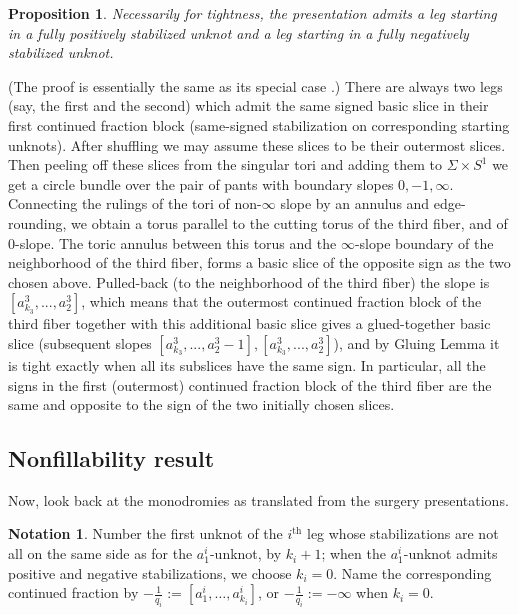 \documentclass{amsart}
\newtheorem{prop}[thm]{Proposition}
\theoremstyle{definition}
\newtheorem{notation}[thm]{Notation}
\begin{document}
\begin{prop}\label{prop:opposite}
Necessarily for tightness, the presentation admits a leg starting in a fully positively stabilized unknot and a leg starting in a fully negatively stabilized unknot.
\end{prop}

\proof
(The proof is essentially the same as its special case \cite[Proposition 2.11]{GLS}.) There are always two legs (say, the first and the second) which admit the same signed basic slice in their first continued fraction block (same-signed stabilization on corresponding starting unknots). After shuffling we may assume these slices to be their outermost slices. Then peeling off these slices from the singular tori and adding them to $\Sigma\times S^1$ we get a circle bundle over the pair of pants with boundary slopes $0,-1,\infty$. Connecting the rulings of the tori of non-$\infty$ slope by an annulus and edge-rounding, we obtain a torus parallel to the cutting torus of the third fiber, and of $0$-slope. The toric annulus between this torus and the $\infty$-slope boundary of the neighborhood of the third fiber, forms a basic slice of the opposite sign as the two chosen above. Pulled-back (to the neighborhood of the third fiber) the slope is $[a^3_{k_3}, . . . , a_2^3]$, which means that the outermost continued fraction block of the third fiber together with this additional basic slice gives a glued-together basic slice (subsequent slopes $[a^3_{k_3}, . . . , a_2^3-1],[a^3_{k_3}, . . . , a_2^3]$), and by Gluing Lemma it is tight exactly when all its subslices have the same sign. In particular, all the signs in the first (outermost) continued fraction block of the third fiber are the same and opposite to the sign of the two initially chosen slices.
\endproof

\subsection{Nonfillability result}
Now, look back at the monodromies as translated from the surgery presentations.

\begin{notation}
Number the first unknot of the $i^\text{th}$ leg whose stabilizations are not all on the same side as for the $a_1^i$-unknot, by $k_i+1$; when the $a_1^i$-unknot admits positive and negative stabilizations, we choose $k_i=0$. Name the corresponding continued fraction by $-\frac{1}{q_i}:=[a_1^i,\dots,a_{k_i}^i]$, or $-\frac{1}{q_i}:=-\infty$ when $k_i=0$.
\end{notation}
\end{document}
